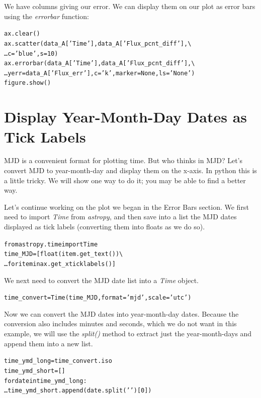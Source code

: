 We have columns giving our error. We can display them on our plot as
error bars using the \textit{errorbar} function:

\begin{alltt}
\pytab ax.clear()
\pytab ax.scatter(data_A['Time'], data_A['Flux_pcnt_diff'], \textbackslash
\ldots c='blue', s=10)
\pytab ax.errorbar(data_A['Time'], data_A['Flux_pcnt_diff'], \textbackslash 
\ldots yerr=data_A['Flux_err'], c='k', marker=None, ls='None')
\pytab figure.show()
\end{alltt}


\section{Display Year-Month-Day Dates as Tick Labels}

MJD is a convenient format for plotting time. But who 
thinks in MJD? Let's convert MJD to year-month-day and display them 
on the x-axis. In python this is a little tricky. We will show one way to do
it; you may be able to find a better way.

Let's continue working on the plot we began in the Error Bars section.
We first need to import \textit{Time} from \textit{astropy}, and then save
into a list the MJD dates displayed as tick labels (converting them into
floats as we do so).

\begin{alltt}
\pytab from astropy.time import Time
\pytab time\_MJD = [float(item.get\_text()) \textbackslash
\ldots for item in ax.get\_xticklabels()]
\end{alltt}

We next need to convert the MJD date list into a \textit{Time} object. 

\begin{alltt}
\pytab time\_convert = Time(time\_MJD, format='mjd', scale='utc')
\end{alltt}

Now we can convert the MJD dates into year-month-day dates. Because
the conversion also includes minutes and seconds, which we do not want
in this example, we will use the \textit{split()} method to extract just the 
year-month-days and append them into a new list. 

\begin{alltt}
\pytab time\_ymd\_long = time\_convert.iso
\pytab time\_ymd\_short = []
\pytab for date in time\_ymd\_long:
\ldots    time\_ymd\_short.append(date.split(' ')[0])
\end{alltt}

